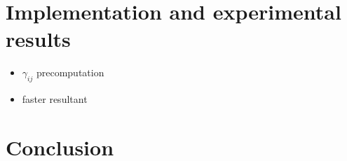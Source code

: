\documentclass{article}
\begin{document}
\section{Implementation and experimental results}
\label{sec:impl-exper-results}

\begin{itemize}
\item $\gamma_{ij}$ precomputation
\item faster resultant
\end{itemize}

\section{Conclusion}
\label{sec:conclusion}





\end{document}
